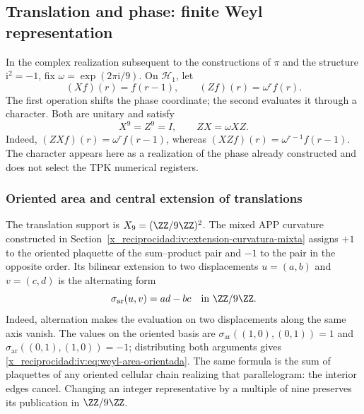 \subsection{Translation and phase: finite Weyl representation}

In the complex realization subsequent to the constructions of
\(\pi\) and the structure \(\mathrm i^2=-1\), fix
\(\omega=\exp(2\pi\mathrm i/9)\). On \(\mathcal H_1\), let
\begin{equation}
 (Xf)(r)=f(r-1),\qquad (Zf)(r)=\omega^r f(r).
 \label{x_reciprocidad:iv:eq:weyl-operadores}
\end{equation}
The first operation shifts the phase coordinate; the second
evaluates it through a character. Both are unitary and satisfy
\begin{equation}
 X^9=Z^9=I,\qquad ZX=\omega XZ.
 \label{x_reciprocidad:iv:eq:weyl-relacion}
\end{equation}
Indeed, \((ZXf)(r)=\omega^r f(r-1)\), whereas
\((XZf)(r)=\omega^{r-1}f(r-1)\). The character appears here as a
realization of the phase already constructed and does not select the TPK
numerical registers.

\subsubsection{Oriented area and central extension of translations}
\label{x_reciprocidad:iv:weyl-area-extension}

The translation support is \(X_9=(\ZZ/9\ZZ)^2\).
The mixed APP curvature constructed in
Section~\ref{x_reciprocidad:iv:extension-curvatura-mixta} assigns \(+1\) to the
oriented plaquette of the sum--product pair and \(-1\) to the
pair in the opposite order. Its bilinear extension to two displacements
\(u=(a,b)\) and \(v=(c,d)\) is the alternating form
\begin{equation}
 \sigma_{\mathrm{ar}}(u,v)=ad-bc\quad\text{in }\ZZ/9\ZZ.
 \label{x_reciprocidad:iv:eq:weyl-area-orientada}
\end{equation}
Indeed, alternation makes the evaluation on two displacements
along the same axis vanish. The values on the oriented basis are
\(\sigma_{\mathrm{ar}}((1,0),(0,1))=1\) and
\(\sigma_{\mathrm{ar}}((0,1),(1,0))=-1\); distributing both
arguments gives \eqref{x_reciprocidad:iv:eq:weyl-area-orientada}. The same formula is
the sum of plaquettes of any oriented cellular chain realizing
that parallelogram: the interior edges cancel. Changing an
integer representative by a multiple of nine preserves its publication
in \(\ZZ/9\ZZ\).

